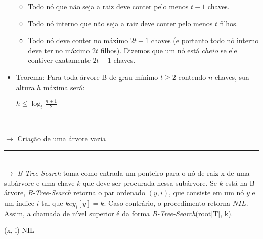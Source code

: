 \documentclass[a4paper, 12pt]{article}
\begin{document}
\begin{itemize}
\begin{itemize}
\item Todo nó que não seja a raiz deve conter pelo menos $t - 1$ chaves.
\item Todo nó interno que não seja a raiz deve conter pelo menos $t$ filhos.
\item Todo nó deve conter no máximo $2t - 1$ chaves (e portanto todo nó interno deve ter no máximo $2t$ filhos). Dizemos que um nó está $cheio$ se ele contiver exatamente $2t - 1$ chaves.
\end{itemize}



\item {} Teorema: Para toda árvore B de grau mínimo $t \geq 2$ contendo $n$ chaves, sua altura $h$ máxima será:\\

\begin{center}
$h \leq \log_{t}\frac{n+1}{2}$
\end{center}


\end{itemize}

\rule{12cm}{0.4pt}\\

$\rightarrow$ Criação de uma árvore vazia\\

\begin{algorithmic}[1]
\end{algorithmic}

\rule{12cm}{0.4pt}\\

$\rightarrow$ \textit{B-Tree-Search} toma como entrada um ponteiro para o nó de raiz x de uma subárvore e uma chave $k$ que deve ser
procurada nessa subárvore. Se $k$ está na B-árvore, \textit{B-Tree-Search} retorna o par ordenado $(y, i)$, que consiste em um nó $y$ e um índice $i$ tal que $key_{i}[y] = k$. Caso contrário, o procedimento retorna $NIL$. Assim, a chamada de nível superior é da forma \textit{B-Tree-Search}(root[T], k).\\

\begin{algorithmic}[1]
\EndWhile
{}
	\State \Return (x, i)
	\State \Return NIL
\Else
\EndIf

\State {}
\end{algorithmic}
\end{document}
